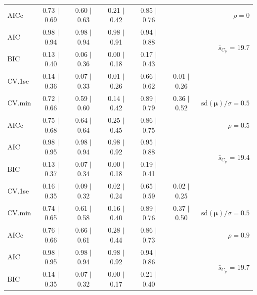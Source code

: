\documentclass[12pt]{article}
\newcommand{\mr}[1]{\mathrm{#1}}
\newcommand{\bm}[1]{\mathbf{#1}}
\begin{document}
\begin{table}[p]
\begin{center}
\begin{tabular}{l*{5}{c}|r}
AICc & 0.73 $\mid$ 0.69 & 0.60 $\mid$ 0.63 & 0.21 $\mid$ 0.42 & 0.85 $\mid$ 0.76 & & $\rho=0$ \\
AIC & 0.98 $\mid$ 0.94 & 0.98 $\mid$ 0.94 & 0.98 $\mid$ 0.91 & 0.94 $\mid$ 0.88 & & \multirow{2}{*}{$\bar{s}_{C_p}$ = 19.7} \\
BIC & 0.13 $\mid$ 0.40 & 0.06 $\mid$ 0.36 & 0.00 $\mid$ 0.18 & 0.17 $\mid$ 0.43 & & \\
 \hline 
CV.1se & 0.14 $\mid$ 0.36 & 0.07 $\mid$ 0.33 & 0.01 $\mid$ 0.26 & 0.66 $\mid$ 0.62 & 0.01 $\mid$ 0.26 &\\
CV.min & 0.72 $\mid$ 0.66 & 0.59 $\mid$ 0.60 & 0.14 $\mid$ 0.42 & 0.89 $\mid$ 0.79 & 0.36 $\mid$ 0.52 &  $\mr{sd}(\bm{\mu})/\sigma=0.5$ \\
AICc & 0.75 $\mid$ 0.68 & 0.64 $\mid$ 0.64 & 0.25 $\mid$ 0.45 & 0.86 $\mid$ 0.75 & & $\rho=0.5$ \\
AIC & 0.98 $\mid$ 0.95 & 0.98 $\mid$ 0.94 & 0.98 $\mid$ 0.92 & 0.95 $\mid$ 0.88 & & \multirow{2}{*}{$\bar{s}_{C_p}$ = 19.4} \\
BIC & 0.13 $\mid$ 0.37 & 0.07 $\mid$ 0.34 & 0.00 $\mid$ 0.18 & 0.19 $\mid$ 0.41 & & \\
 \hline 
CV.1se & 0.16 $\mid$ 0.35 & 0.09 $\mid$ 0.32 & 0.02 $\mid$ 0.24 & 0.65 $\mid$ 0.59 & 0.02 $\mid$ 0.25 &\\
CV.min & 0.74 $\mid$ 0.65 & 0.61 $\mid$ 0.58 & 0.16 $\mid$ 0.40 & 0.89 $\mid$ 0.76 & 0.37 $\mid$ 0.50 &  $\mr{sd}(\bm{\mu})/\sigma=0.5$ \\
AICc & 0.76 $\mid$ 0.66 & 0.66 $\mid$ 0.61 & 0.28 $\mid$ 0.44 & 0.86 $\mid$ 0.73 & & $\rho=0.9$ \\
AIC & 0.98 $\mid$ 0.95 & 0.98 $\mid$ 0.94 & 0.98 $\mid$ 0.92 & 0.94 $\mid$ 0.86 & & \multirow{2}{*}{$\bar{s}_{C_p}$ = 19.7} \\
BIC & 0.14 $\mid$ 0.35 & 0.07 $\mid$ 0.32 & 0.00 $\mid$ 0.17 & 0.21 $\mid$ 0.40 & & \\
 \hline 
 \end{tabular}
\end{center}
\vspace{-1cm}
\end{table}
\end{document}

